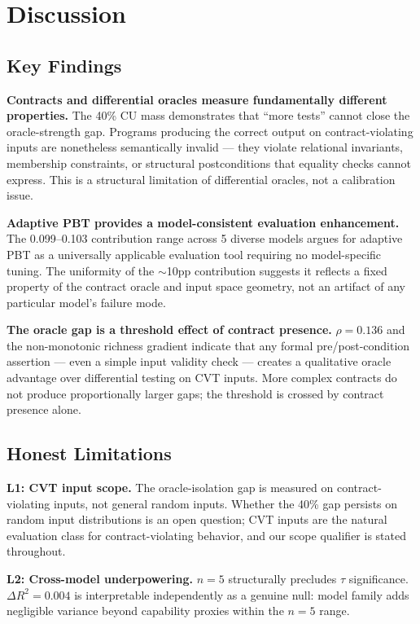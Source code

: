 \section{Discussion}
\label{sec:discussion}

\subsection{Key Findings}

\textbf{Contracts and differential oracles measure fundamentally different properties.} The 40\% CU mass demonstrates that ``more tests'' cannot close the oracle-strength gap. Programs producing the correct output on contract-violating inputs are nonetheless semantically invalid --- they violate relational invariants, membership constraints, or structural postconditions that equality checks cannot express. This is a structural limitation of differential oracles, not a calibration issue.

\textbf{Adaptive PBT provides a model-consistent evaluation enhancement.} The 0.099--0.103 contribution range across 5 diverse models argues for adaptive PBT as a universally applicable evaluation tool requiring no model-specific tuning. The uniformity of the $\sim$10pp contribution suggests it reflects a fixed property of the contract oracle and input space geometry, not an artifact of any particular model's failure mode.

\textbf{The oracle gap is a threshold effect of contract presence.} $\rho = 0.136$ and the non-monotonic richness gradient indicate that any formal pre/post-condition assertion --- even a simple input validity check --- creates a qualitative oracle advantage over differential testing on CVT inputs. More complex contracts do not produce proportionally larger gaps; the threshold is crossed by contract presence alone.

\subsection{Honest Limitations}

\textbf{L1: CVT input scope.} The oracle-isolation gap is measured on contract-violating inputs, not general random inputs. Whether the 40\% gap persists on random input distributions is an open question; CVT inputs are the natural evaluation class for contract-violating behavior, and our scope qualifier is stated throughout.

\textbf{L2: Cross-model underpowering.} $n=5$ structurally precludes $\tau$ significance. $\Delta R^2 = 0.004$ is interpretable independently as a genuine null: model family adds negligible variance beyond capability proxies within the $n=5$ range.

